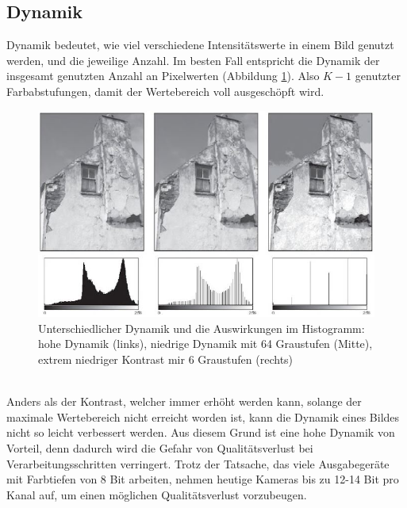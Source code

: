 \subsection{Dynamik}\label{s.dynamik}
Dynamik bedeutet, wie viel verschiedene Intensitätswerte in einem Bild genutzt werden, und die jeweilige Anzahl\cite[44]{burger2009digitale}. Im besten Fall entspricht die Dynamik der insgesamt genutzten Anzahl an Pixelwerten (Abbildung \ref{img:dynamik}). Also $K-1$ genutzter Farbabstufungen, damit der Wertebereich voll ausgeschöpft wird.\\
 \begin{figure}
    [h]
    \centering
    \includegraphics[scale=0.7]{Sources/dynamik.JPG}
    \caption{Unterschiedlicher Dynamik und die Auswirkungen im Histogramm: hohe Dynamik (links), niedrige Dynamik mit 64 Graustufen (Mitte), extrem niedriger Kontrast mir 6 Graustufen (rechts)\cite[45]{burger2009digitale}}
    \label{img:dynamik}
  \end{figure}\\
Anders als der Kontrast, welcher immer erhöht werden kann, solange der maximale Wertebereich nicht erreicht worden ist, kann die Dynamik eines Bildes nicht so leicht verbessert werden. Aus diesem Grund ist eine hohe Dynamik von Vorteil, denn dadurch wird die Gefahr von Qualitätsverlust bei Verarbeitungsschritten verringert. Trotz der Tatsache, das viele Ausgabegeräte mit Farbtiefen von 8 Bit arbeiten, nehmen heutige Kameras bis zu 12-14 Bit pro Kanal auf, um einen möglichen Qualitätsverlust vorzubeugen.

